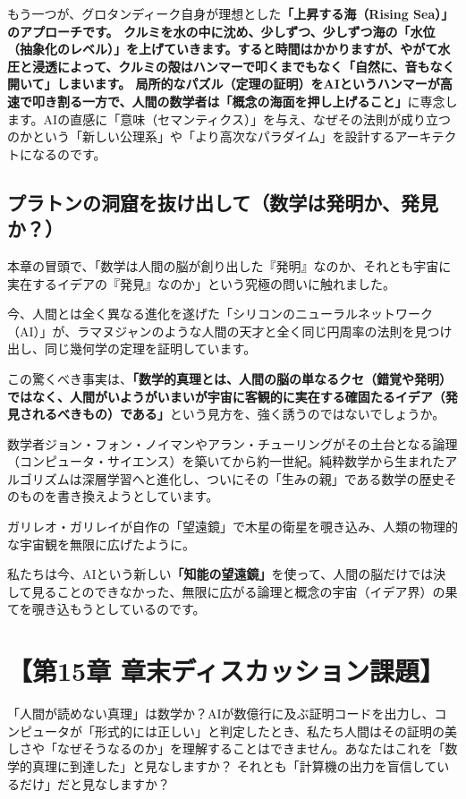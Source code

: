 もう一つが、グロタンディーク自身が理想とした\textbf{「上昇する海（Rising Sea）」のアプローチです。 クルミを水の中に沈め、少しずつ、少しずつ海の「水位（抽象化のレベル）」を上げていきます。すると時間はかかりますが、やがて水圧と浸透によって、クルミの殻はハンマーで叩くまでもなく「自然に、音もなく開いて」しまいます。 局所的なパズル（定理の証明）をAIというハンマーが高速で叩き割る一方で、人間の数学者は「概念の海面を押し上げること」}に専念します。AIの直感に「意味（セマンティクス）」を与え、なぜその法則が成り立つのかという「新しい公理系」や「より高次なパラダイム」を設計するアーキテクトになるのです。

\subsection{プラトンの洞窟を抜け出して（数学は発明か、発見か？）}

本章の冒頭で、「数学は人間の脳が創り出した『発明』なのか、それとも宇宙に実在するイデアの『発見』なのか」という究極の問いに触れました。

今、人間とは全く異なる進化を遂げた「シリコンのニューラルネットワーク（AI）」が、ラマヌジャンのような人間の天才と全く同じ円周率の法則を見つけ出し、同じ幾何学の定理を証明しています。

この驚くべき事実は、\textbf{「数学的真理とは、人間の脳の単なるクセ（錯覚や発明）ではなく、人間がいようがいまいが宇宙に客観的に実在する確固たるイデア（発見されるべきもの）である」}という見方を、強く誘うのではないでしょうか。

数学者ジョン・フォン・ノイマンやアラン・チューリングがその土台となる論理（コンピュータ・サイエンス）を築いてから約一世紀。純粋数学から生まれたアルゴリズムは深層学習へと進化し、ついにその「生みの親」である数学の歴史そのものを書き換えようとしています。

ガリレオ・ガリレイが自作の「望遠鏡」で木星の衛星を覗き込み、人類の物理的な宇宙観を無限に広げたように。

私たちは今、AIという新しい\textbf{「知能の望遠鏡」}を使って、人間の脳だけでは決して見ることのできなかった、無限に広がる論理と概念の宇宙（イデア界）の果てを覗き込もうとしているのです。

\section*{【第15章 章末ディスカッション課題】}

「人間が読めない真理」は数学か？AIが数億行に及ぶ証明コードを出力し、コンピュータが「形式的には正しい」と判定したとき、私たち人間はその証明の美しさや「なぜそうなるのか」を理解することはできません。あなたはこれを「数学的真理に到達した」と見なしますか？ それとも「計算機の出力を盲信しているだけ」だと見なしますか？

